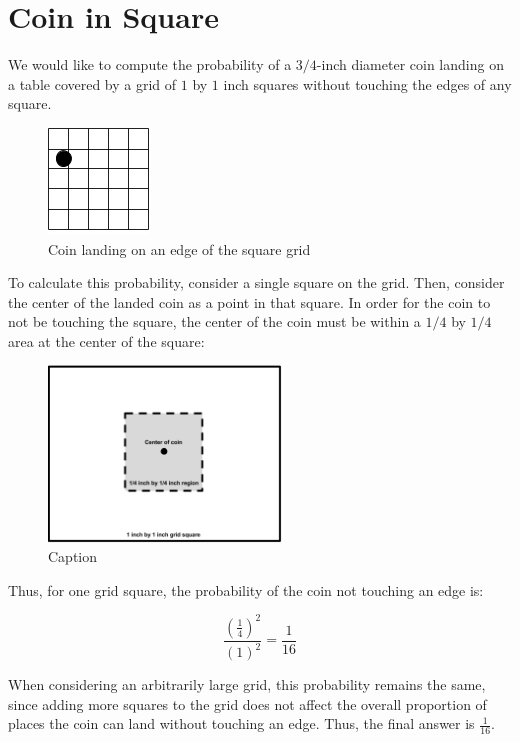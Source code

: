 \documentclass{article}
\date{}
\author{Kaan Aksoy | Feb 13, 2020}
\begin{document}
\maketitle

\section{Coin in Square}

We would like to compute the probability of a $3/4$-inch 
diameter coin landing on a table covered by a grid of $1$ 
by $1$ inch squares without touching the edges of any square.

\begin{figure}[h]
\centering
\includegraphics{CoinOnGrid.png}
\caption{Coin landing on an edge of the square grid}
\end{figure}

To calculate this probability, consider a single square 
on the grid. Then, consider the center of the landed coin 
as a point in that square. In order for the coin to not be 
touching the square, the center of the coin must be 
within a $1/4$ by $1/4$ area at the center of the square:

\begin{figure}[h]
    \centering
    \includegraphics[width=6.25cm]{CoinValidSpots.png}
    \caption{Caption}
\end{figure}

Thus, for one grid square, the probability of the 
coin not touching an edge is:

$$ \frac{\left( \frac{1}{4} \right)^2}{(1)^2} = \frac{1}{16}$$

When considering an arbitrarily large grid, this probability 
remains the same, since adding more squares to the 
grid does not affect the overall proportion of places the coin 
can land without touching an edge. Thus, the final answer is $\frac{1}{16}$.
\end{document}
